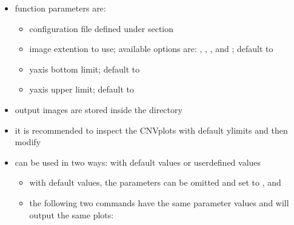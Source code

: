 \documentclass[letterpaper,10pt,english]{sphinxhowto}
\begin{document}
\begin{sphinxVerbatim}[commandchars=\\\{\}]
 \PYG{p}{[} \PYG{p}{]}      
\end{sphinxVerbatim}
\begin{itemize}
\item {} 
\sphinxAtStartPar
function parameters are:
\begin{itemize}
\item {} 
\sphinxAtStartPar
{} \sphinxhyphen{} configuration file defined under  section

\item {} 
\sphinxAtStartPar
{} \sphinxhyphen{}  image extention to use; available options are: , , , and ; default to 

\item {} 
\sphinxAtStartPar
{} \sphinxhyphen{} y\sphinxhyphen{}axis bottom limit; default to 

\item {} 
\sphinxAtStartPar
{} \sphinxhyphen{} y\sphinxhyphen{}axis upper limit; default to 

\end{itemize}

\item {} 
\sphinxAtStartPar
output images are stored inside the  directory

\item {} 
\sphinxAtStartPar
it is recommended to inspect the CNV\sphinxhyphen{}plots with default y\sphinxhyphen{}limits and then modify

\item {} 
\sphinxAtStartPar
{} can be used in two ways: with default values or user\sphinxhyphen{}defined values
\begin{itemize}
\item {} 
\sphinxAtStartPar
with default values, the parameters can be omitted and set to ,  and 

\item {} 
\sphinxAtStartPar
the following two commands have the same parameter values and will output the same plots:

\end{itemize}

\end{itemize}
\end{document}
